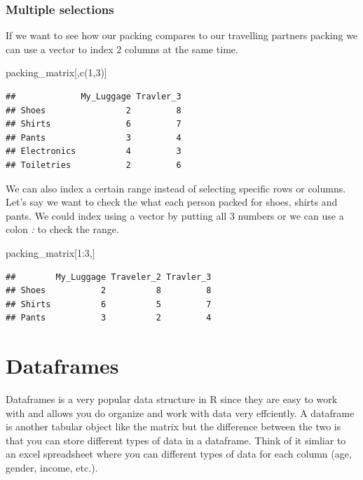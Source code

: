 \documentclass[
]{book}
\newenvironment{Shaded}{\begin{snugshade}}{\end{snugshade}}
\newcommand{\DecValTok}[1]{\textcolor[rgb]{0.00,0.00,0.81}{#1}}
\newcommand{\FunctionTok}[1]{\textcolor[rgb]{0.00,0.00,0.00}{#1}}
\newcommand{\NormalTok}[1]{#1}
\newcommand{\SpecialCharTok}[1]{\textcolor[rgb]{0.00,0.00,0.00}{#1}}
\begin{document}
\hypertarget{multiple-selections}{%
\subsubsection{Multiple selections}\label{multiple-selections}}

If we want to see how our packing compares to our travelling partners packing we can use a vector to index 2 columns at the same time.

\begin{Shaded}
\begin{Highlighting}[]
\NormalTok{packing\_matrix[,}\FunctionTok{c}\NormalTok{(}\DecValTok{1}\NormalTok{,}\DecValTok{3}\NormalTok{)]}
\end{Highlighting}
\end{Shaded}

\begin{verbatim}
##             My_Luggage Travler_3
## Shoes                2         8
## Shirts               6         7
## Pants                3         4
## Electronics          4         3
## Toiletries           2         6
\end{verbatim}

We can also index a certain range instead of selecting specific rows or columns. Let's say we want to check the what each person packed for shoes, shirts and pants. We could index using a vector by putting all 3 numbers or we can use a colon \emph{:} to check the range.

\begin{Shaded}
\begin{Highlighting}[]
\NormalTok{packing\_matrix[}\DecValTok{1}\SpecialCharTok{:}\DecValTok{3}\NormalTok{,]}
\end{Highlighting}
\end{Shaded}

\begin{verbatim}
##        My_Luggage Traveler_2 Travler_3
## Shoes           2          8         8
## Shirts          6          5         7
## Pants           3          2         4
\end{verbatim}

\hypertarget{dataframes}{%
\section{Dataframes}\label{dataframes}}

Dataframes is a very popular data structure in R since they are easy to work with and allows you do organize and work with data very effciently. A dataframe is another tabular object like the matrix but the difference between the two is that you can store different types of data in a dataframe. Think of it simliar to an excel spreadsheet where you can different types of data for each column (age, gender, income, etc.).
\end{document}
